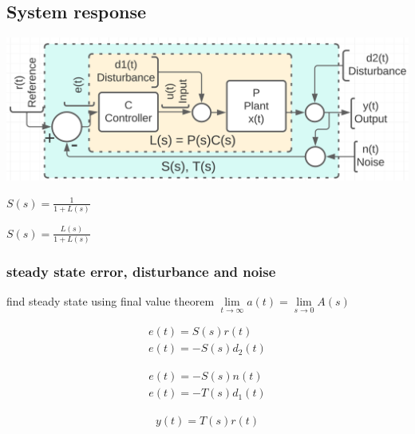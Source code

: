 \subsection{System response}
    \includegraphics[width = \linewidth]{src/images/basic_block_chart.png}
    \begin{minipage}{0.49\linewidth}
        \begin{center}
            $S(s) = \frac{1}{1 + L(s)}$
        \end{center}
    \end{minipage}
    \begin{minipage}{0.49\linewidth}
        \begin{center}
            $S(s) = \frac{L(s)}{1 + L(s)}$
        \end{center}
    \end{minipage}
    
    \subsubsection{steady state error, disturbance and noise}
    find steady state using final value theorem $\lim\limits_{t \rightarrow \infty} a(t) = \lim\limits_{s \rightarrow 0} A(s)$
    \begin{minipage}{0.32\linewidth}
        \begin{align*}
            e(t) = S(s) r(t)\\
            e(t) = - S(s) d_2(t)
        \end{align*}
    \end{minipage}
    \begin{minipage}{0.32\linewidth}
        \begin{align*}
            e(t) = - S(s) n(t)\\
            e(t) = - T(s) d_1(t)
        \end{align*}
    \end{minipage}
    \begin{minipage}{0.32\linewidth}
        \begin{align*}
            y(t) = T(s) r(t)
        \end{align*}
    \end{minipage}


